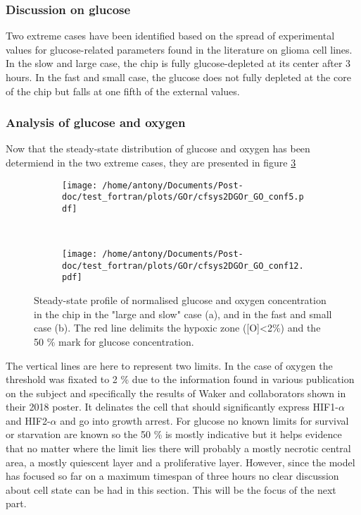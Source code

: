 \documentclass[11pt,a4paper]{article}
\begin{document}
\subsubsection{Discussion on glucose}
Two extreme cases have been identified based on the spread of experimental values for glucose-related parameters found in the literature on glioma cell lines. In the slow and large case, the chip is fully glucose-depleted at its center after 3 hours. In the fast and small case, the glucose does not fully depleted at the core of the chip but falls at one fifth of the external values.

\subsubsection{Analysis of glucose and oxygen}
Now that the steady-state distribution of glucose and oxygen has been determiend in the two extreme cases, they are presented in figure \ref{GO_x}

\begin{figure}[ht!]
	\begin{subfigure}{0.45\textwidth}
	\centering
	\texttt{[image: /home/antony/Documents/Post-doc/test\_fortran/plots/GOr/cfsys2DGOr\_GO\_conf5.pdf]}
	\caption{ \label{G_ctr_conf12}}
	\end{subfigure}
	~~
	\begin{subfigure}{0.45\textwidth}
	\texttt{[image: /home/antony/Documents/Post-doc/test\_fortran/plots/GOr/cfsys2DGOr\_GO\_conf12.pdf]}
		\caption{ \label{Gt_conf12}}
	\end{subfigure}
	\caption{Steady-state profile of normalised glucose and oxygen concentration in the chip in the "large and slow" case (a), and in the fast and small case (b). The red line delimits the hypoxic zone ([O]<2\%) and the 50 \% mark for glucose concentration. \label{GO_x}}
	\end{figure}
	
The vertical lines are here to represent two limits. In the case of oxygen the threshold was fixated to 2 \% due to the information found in various publication on the subject and specifically the results of Waker and collaborators shown in their 2018 poster.\cite{Waker2018} It delinates the cell that should significantly express HIF1-$\alpha$  and HIF2-$\alpha$ and go into growth arrest. For glucose no known limits for survival or starvation are known so the 50 \% is mostly indicative  but it helps evidence that no matter where the limit lies there will probably a mostly necrotic central area, a mostly quiescent layer and a proliferative layer. However, since the model has focused so far on a maximum timespan of three hours no clear discussion about cell state can be had in this section. This will be the focus of the next part.
\end{document}

